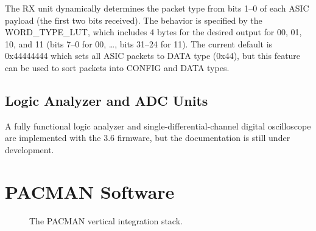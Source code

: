 \documentclass[12pt]{article}
\begin{document}
The RX unit dynamically determines the packet type from bits 1--0 of
each ASIC payload (the first two bits received).  The behavior is specified by the
WORD\_TYPE\_LUT, which includes 4 bytes for the desired output
for 00, 01, 10, and 11 (bits 7--0 for 00, \ldots, bits 31--24 for 11).  The current default is 0x44444444 which sets all
ASIC packets to DATA type (0x44), but this feature can be used to sort
packets into CONFIG and DATA types.

\subsection{Logic Analyzer and ADC Units}
A fully functional logic analyzer and single-differential-channel
digital oscilloscope are implemented with the 3.6 firmware, but the
documentation is still under development.




\newpage
\section{PACMAN Software}

\begin{figure}[htbp]
\centering
{}
\caption{The PACMAN vertical integration stack.}
\label{fig:pacman-stack}
\end{figure}
\end{document}
